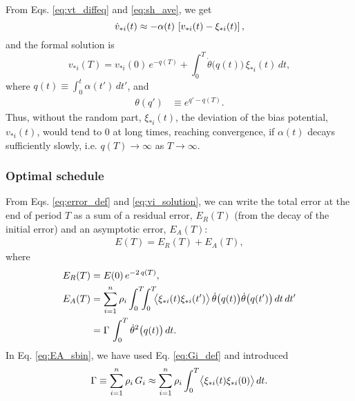 \documentclass[preprint, superscriptaddress, floatfix]{revtex4-1}
\newcommand{\Err}{E}
\begin{document}
From Eqs.
\eqref{eq:vt_diffeq} and \eqref{eq:sh_ave},
we get %
%
\begin{equation}
  \dot v_{*i}(t)
  \approx
  -\alpha(t) \, \left[ v_{*i}(t) - \xi_{*i}(t) \right]
  ,
  \notag
\end{equation}
%
and the formal solution is %
%
\begin{equation}
  v_{*i}(T)
  =
  v_{*i}(0) \, e^{-q(T)}
  +
  \int_0^T
    \dot{\theta}\bigl( q(t) \bigr) \, \xi_{*i}(t) \, dt,
  \label{eq:vi_solution}
\end{equation}
%
where
%
$q(t) \equiv \int_0^t \alpha(t') \, dt'$,
%
and
%
\begin{align}
  \theta(q')
  &\equiv
  e^{q' - q(T)}.
  \label{eq:theta_def}
\end{align}
%
Thus, without the random part, $\xi_{*i}(t)$,
the deviation of the bias potential, $v_{*i}(t)$,
would tend to $0$ at long times, reaching convergence,
if $\alpha(t)$ decays sufficiently slowly,
i.e. $q(T) \to \infty$ as $T \to \infty$.




\subsubsection{Optimal schedule}



From Eqs. \eqref{eq:error_def} and
\eqref{eq:vi_solution},
we can write the total error at the end of period $T$
as a sum of a residual error, $E_R(T)$ (from the decay of the initial error)
and an asymptotic error, $E_A(T)$:
%
\begin{align}
  \Err(T)
  =
  \Err_R(T) + \Err_A(T)
  ,
  \label{eq:error_tot}
\end{align}
%
where
\begin{align}
  \Err_R(T)
  &= \Err(0) \, e^{-2 \, q(T)}
  ,
  \label{eq:ER_sbin}
  \\
  \Err_A(T)
  &=
  \sum_{i=1}^n \rho_i
    \int_0^T\!\!\!\int_0^T
    \!\!
    \bigl\langle
      \xi_{*i}(t) \xi_{*i}(t')
    \bigr\rangle
    \,
    \dot \theta\bigl( q(t) \bigr)
    \dot \theta\bigl( q(t') \bigr)
    \, dt \, dt'
  \notag \\
  &= \Gamma \, \int_0^T \dot \theta^2\bigl( q(t) \bigr) \, dt
  .
  \label{eq:EA_sbin}
\end{align}
In Eq. \eqref{eq:EA_sbin},
we have used Eq. \eqref{eq:Gi_def} and introduced
\begin{equation}
  \Gamma
  \equiv
  \sum_{i=1}^n \rho_i \, G_i
  \approx
  \sum_{i=1}^n \rho_i \int_0^T
    \bigl\langle \xi_{*i}(t) \xi_{*i}(0) \bigr\rangle
    \, dt
  .
  \notag%
\end{equation}
\end{document}
